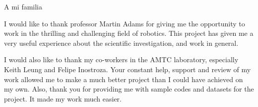 \documentclass[upright, contnum]{umemoria}
\begin{document}
\begin{dedicatoria} %
A mi familia
\end{dedicatoria}

\begin{thanks} %
I would like to thank professor Martin Adams for giving me the opportunity to work in the thrilling and challenging field of robotics. This project has given me a very useful experience about the scientific investigation, and work in general.

I would also like to thank my co-workers in the AMTC laboratory, especially Keith Leung and Felipe Inostroza. Your constant help, support and review of my work allowed me to make a much better project than I could have achieved on my own. Also, thank you for providing me with sample codes and datasets for the project. It made my work much easier.
\end{thanks}
\cleardoublepage

\tableofcontents
\listoftables %
\listoffigures %

\mainmatter










\end{document}
